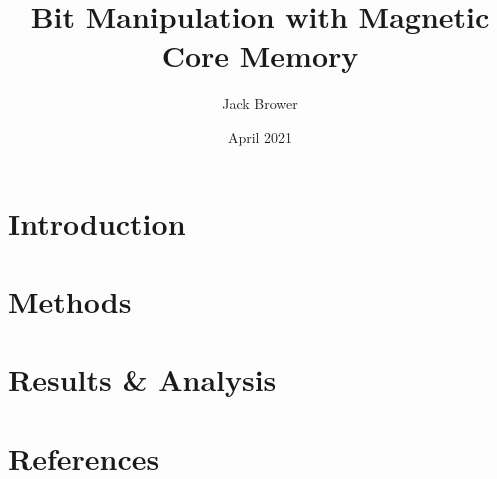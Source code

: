 \documentclass{article}
\title{Bit Manipulation with Magnetic Core Memory}
\author{Jack Brower}
\date{April 2021}
\begin{document}
\maketitle

\section{Introduction}
  
\newpage\section{Methods}

\newpage\section{Results \& Analysis}

\newpage\section{References}
\end{document}
